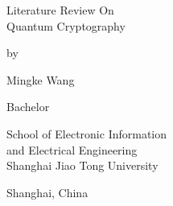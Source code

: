 \begin{titlepage}
  \vspace*{\fill}

  \begin{center}
    {\Huge Literature Review On\\ Quantum Cryptography \par
    }

    \bigskip%
    by

    \bigskip%
    Mingke Wang


    \bigskip\bigskip\bigskip\bigskip%

    \bigskip%

    \bigskip%
    Bachelor


    \bigskip\bigskip\bigskip\bigskip%

    \bigskip\bigskip%
    School of Electronic Information\\
    and Electrical Engineering\\


    \bigskip\bigskip\bigskip\bigskip%
    Shanghai Jiao Tong University

    \bigskip%
    Shanghai, China


    \bigskip\bigskip\bigskip{}
  \end{center}

  \vspace*{\fill}
\end{titlepage}